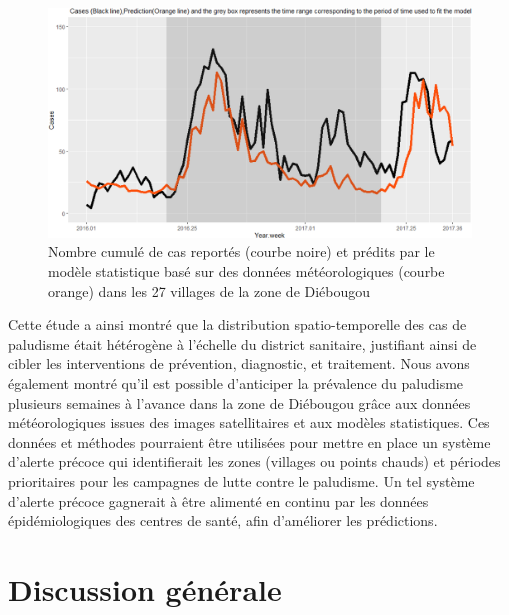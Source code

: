 \documentclass[12pt,twoside]{reedthesis}
\begin{document}
\begin{figure}

{\centering \includegraphics[width=1\linewidth]{figure/prediction_malaria_cases} 

}

\caption[Nombre cumulé de cas reportés et prédits par le modèle statistique basé sur des données météorologiques dans les 27 villages de la zone de Diébougou]{Nombre cumulé de cas reportés (courbe noire) et prédits par le modèle statistique basé sur des données météorologiques (courbe orange) dans les 27 villages de la zone de Diébougou}\label{fig:prediction-malaria-cases}
\end{figure}
Cette étude a ainsi montré que la distribution spatio-temporelle des cas de paludisme était hétérogène à l'échelle du district sanitaire, justifiant ainsi de cibler les interventions de prévention, diagnostic, et traitement. Nous avons également montré qu'il est possible d'anticiper la prévalence du paludisme plusieurs semaines à l'avance dans la zone de Diébougou grâce aux données météorologiques issues des images satellitaires et aux modèles statistiques. Ces données et méthodes pourraient être utilisées pour mettre en place un système d'alerte précoce qui identifierait les zones (villages ou points chauds) et périodes prioritaires pour les campagnes de lutte contre le paludisme. Un tel système d'alerte précoce gagnerait à être alimenté en continu par les données épidémiologiques des centres de santé, afin d'améliorer les prédictions.

\begingroup 
\renewcommand{\headrulewidth}{0pt}

\markboth{}{}


\endgroup

\hypertarget{discussion}{%
\chapter{Discussion générale}\label{discussion}}
\end{document}
